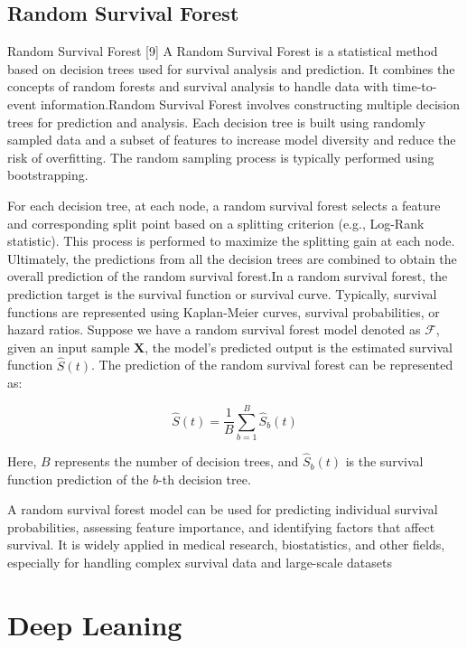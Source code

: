 \documentclass[conference]{IEEEconf}
\begin{document}
\subsection{Random Survival Forest}

Random Survival Forest [9] A Random Survival Forest is a statistical method based on decision trees used for survival analysis and prediction. It combines the concepts of random forests and survival analysis to handle data with time-to-event information.Random Survival Forest involves constructing multiple decision trees for prediction and analysis. Each decision tree is built using randomly sampled data and a subset of features to increase model diversity and reduce the risk of overfitting. The random sampling process is typically performed using bootstrapping.

For each decision tree, at each node, a random survival forest selects a feature and corresponding split point based on a splitting criterion (e.g., Log-Rank statistic). This process is performed to maximize the splitting gain at each node. Ultimately, the predictions from all the decision trees are combined to obtain the overall prediction of the random survival forest.In a random survival forest, the prediction target is the survival function or survival curve. Typically, survival functions are represented using Kaplan-Meier curves, survival probabilities, or hazard ratios. Suppose we have a random survival forest model denoted as $\mathcal{F}$, given an input sample $\mathbf{X}$, the model's predicted output is the estimated survival function $\hat{S}(t)$. The prediction of the random survival forest can be represented as:

\begin{equation}
	\hat{S}(t) = \frac{1}{B} \sum_{b=1}^B \hat{S}_b(t)
\end{equation}

Here, $B$ represents the number of decision trees, and $\hat{S}_b(t)$ is the survival function prediction of the $b$-th decision tree.

A random survival forest model can be used for predicting individual survival probabilities, assessing feature importance, and identifying factors that affect survival. It is widely applied in medical research, biostatistics, and other fields, especially for handling complex survival data and large-scale datasets

\section{Deep Leaning}
\end{document}
